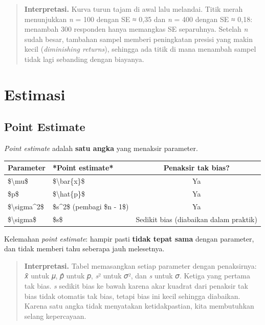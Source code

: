 \documentclass[
  indonesian,
  letterpaper,
]{book}
\begin{document}
\begin{quote}
\textbf{Interpretasi.} Kurva turun tajam di awal lalu melandai. Titik
merah menunjukkan \emph{n} = 100 dengan SE ≈ 0,35 dan \emph{n} = 400
dengan SE ≈ 0,18: menambah 300 responden hanya memangkas SE separuhnya.
Setelah \emph{n} sudah besar, tambahan sampel memberi peningkatan
presisi yang makin kecil (\emph{diminishing returns}), sehingga ada
titik di mana menambah sampel tidak lagi sebanding dengan biayanya.
\end{quote}

\section{Estimasi}\label{estimasi}

\subsection{Point Estimate}\label{point-estimate}

\emph{Point estimate} adalah \textbf{satu angka} yang menaksir
parameter.

\begingroup\fontsize{12}{14}\selectfont

\begin{longtable*}[t]{llc}
\toprule
Parameter & *Point estimate* & Penaksir tak bias?\\
\midrule
\$\textbackslash{}mu\$ & \$\textbackslash{}bar\{x\}\$ & Ya\\
\$p\$ & \$\textbackslash{}hat\{p\}\$ & Ya\\
\$\textbackslash{}sigma\textasciicircum{}2\$ & \$s\textasciicircum{}2\$ (pembagi \$n - 1\$) & Ya\\
\$\textbackslash{}sigma\$ & \$s\$ & Sedikit bias (diabaikan dalam praktik)\\
\bottomrule
\end{longtable*}
\endgroup{}

Kelemahan \emph{point estimate}: hampir pasti \textbf{tidak tepat sama}
dengan parameter, dan tidak memberi tahu seberapa jauh melesetnya.

\begin{quote}
\textbf{Interpretasi.} Tabel memasangkan setiap parameter dengan
penaksirnya: 𝑥̄ untuk 𝜇, 𝑝̂ untuk 𝑝, \emph{s}² untuk 𝜎², dan \emph{s}
untuk 𝜎. Ketiga yang pertama tak bias. \emph{s} sedikit bias ke bawah
karena akar kuadrat dari penaksir tak bias tidak otomatis tak bias,
tetapi bias ini kecil sehingga diabaikan. Karena satu angka tidak
menyatakan ketidakpastian, kita membutuhkan selang kepercayaan.
\end{quote}
\end{document}
